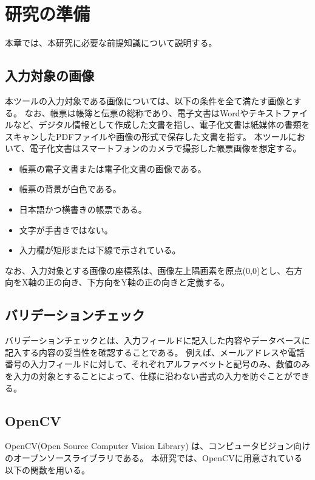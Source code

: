\chapter{研究の準備}\label{cha:Preparation}
本章では、本研究に必要な前提知識について説明する。


\section{入力対象の画像}\label{sec:input_images}
本ツールの入力対象である画像については、以下の条件を全て満たす画像とする。
なお、帳票は帳簿と伝票の総称であり、電子文書はWordやテキストファイルなど、デジタル情報として作成した文書を指し、電子化文書は紙媒体の書類をスキャンしたPDFファイルや画像の形式で保存した文書を指す\cite{電子文書と電子化文書}。
本ツールにおいて、電子化文書はスマートフォンのカメラで撮影した帳票画像を想定する。

\begin{itemize}
	\item 帳票の電子文書または電子化文書の画像である。
	\item 帳票の背景が白色である。
	\item 日本語かつ横書きの帳票である。
	\item 文字が手書きではない。
	\item 入力欄が矩形または下線で示されている。
\end{itemize}

なお、入力対象とする画像の座標系は、画像左上隅画素を原点(0,0)とし、右方向をX軸の正の向き、下方向をY軸の正の向きと定義する。

\section{バリデーションチェック}\label{sec:validation_check}
バリデーションチェックとは、入力フィールドに記入した内容やデータベースに記入する内容の妥当性を確認することである\cite{バリデーションチェック}。
例えば、メールアドレスや電話番号の入力フィールドに対して、それぞれアルファベットと記号のみ、数値のみを入力の対象とすることによって、仕様に沿わない書式の入力を防ぐことができる。

\section{OpenCV}\label{sec:OpenCV}
OpenCV(Open Source Computer Vision Library) は、コンピュータビジョン向けのオープンソースライブラリである\cite{OpenCV}。
本研究では、OpenCVに用意されている以下の関数を用いる。

